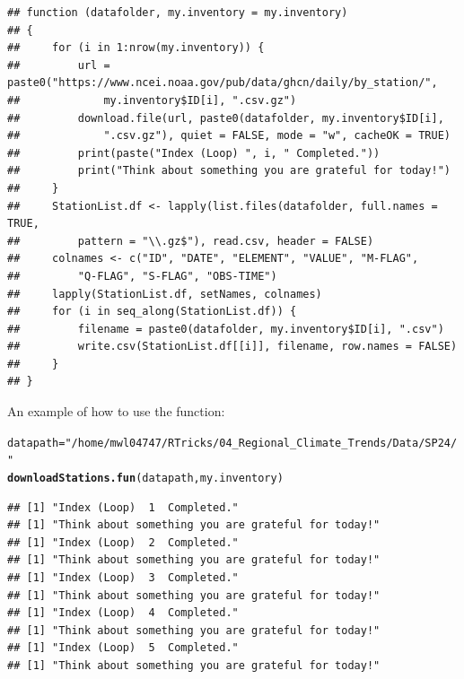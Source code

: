 \documentclass{article}\usepackage[]{graphicx}\usepackage[]{xcolor}
\makeatletter
\newcommand{\hlstr}[1]{\textcolor[rgb]{0.192,0.494,0.8}{#1}}%
\newcommand{\hlstd}[1]{\textcolor[rgb]{0.345,0.345,0.345}{#1}}%
\newcommand{\hlkwb}[1]{\textcolor[rgb]{0.69,0.353,0.396}{#1}}%
\newcommand{\hlkwd}[1]{\textcolor[rgb]{0.737,0.353,0.396}{\textbf{#1}}}%
\newenvironment{kframe}{%
 \def\at@end@of@kframe{}%
 \ifinner\ifhmode%
  \def\at@end@of@kframe{\end{minipage}}%
  \begin{minipage}{\columnwidth}%
 \fi\fi%
 \def\FrameCommand##1{\hskip\@totalleftmargin \hskip-\fboxsep
 \colorbox{shadecolor}{##1}\hskip-\fboxsep
     \hskip-\linewidth \hskip-\@totalleftmargin \hskip\columnwidth}%
 \MakeFramed {\advance\hsize-\width
   \@totalleftmargin\z@ \linewidth\hsize
   \@setminipage}}%
 {\par\unskip\endMakeFramed%
 \at@end@of@kframe}
\newenvironment{knitrout}{}{} %
\makeatother
\begin{document}
\begin{description}
\begin{knitrout}
\color{fgcolor}\begin{kframe}
\begin{verbatim}
## function (datafolder, my.inventory = my.inventory) 
## {
##     for (i in 1:nrow(my.inventory)) {
##         url = paste0("https://www.ncei.noaa.gov/pub/data/ghcn/daily/by_station/", 
##             my.inventory$ID[i], ".csv.gz")
##         download.file(url, paste0(datafolder, my.inventory$ID[i], 
##             ".csv.gz"), quiet = FALSE, mode = "w", cacheOK = TRUE)
##         print(paste("Index (Loop) ", i, " Completed."))
##         print("Think about something you are grateful for today!")
##     }
##     StationList.df <- lapply(list.files(datafolder, full.names = TRUE, 
##         pattern = "\\.gz$"), read.csv, header = FALSE)
##     colnames <- c("ID", "DATE", "ELEMENT", "VALUE", "M-FLAG", 
##         "Q-FLAG", "S-FLAG", "OBS-TIME")
##     lapply(StationList.df, setNames, colnames)
##     for (i in seq_along(StationList.df)) {
##         filename = paste0(datafolder, my.inventory$ID[i], ".csv")
##         write.csv(StationList.df[[i]], filename, row.names = FALSE)
##     }
## }
\end{verbatim}
\end{kframe}
\end{knitrout}


An example of how to use the function: 

\begin{knitrout}
\color{fgcolor}\begin{kframe}
\begin{alltt}
\hlstd{datapath} \hlkwb{=} \hlstr{"/home/mwl04747/RTricks/04_Regional_Climate_Trends/Data/SP24/"}
\hlkwd{downloadStations.fun}\hlstd{(datapath, my.inventory)}
\end{alltt}
\begin{verbatim}
## [1] "Index (Loop)  1  Completed."
## [1] "Think about something you are grateful for today!"
## [1] "Index (Loop)  2  Completed."
## [1] "Think about something you are grateful for today!"
## [1] "Index (Loop)  3  Completed."
## [1] "Think about something you are grateful for today!"
## [1] "Index (Loop)  4  Completed."
## [1] "Think about something you are grateful for today!"
## [1] "Index (Loop)  5  Completed."
## [1] "Think about something you are grateful for today!"
\end{verbatim}
\end{kframe}
\end{knitrout}


\end{description}
\end{document}
